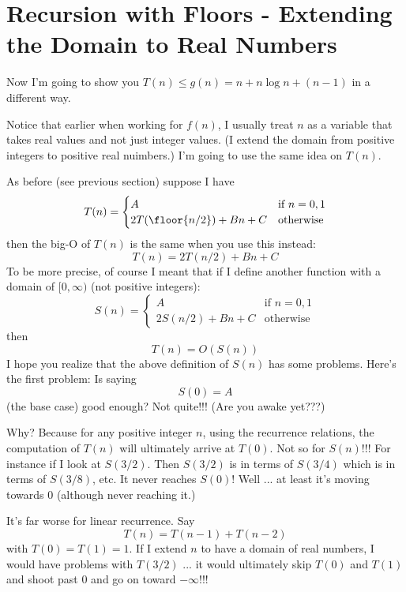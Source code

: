\section{Recursion with Floors - Extending the 
Domain to Real Numbers}

Now I'm going to show you $T(n) \leq g(n) = n + n \log n + (n - 1)$
in a different way.

Notice that earlier when working for $f(n)$, I usually treat $n$
as a variable that takes real values and not just integer values.
(I extend the domain from positive integers to positive real nuimbers.)
I'm going to use the same idea on $T(n)$.

As before (see previous section) suppose I have
\[
T(n) 
= 
\begin{cases}
A                        & \text{if $n = 0, 1$} \\
2T(\floor{n/2}) + Bn + C & \text{otherwise}
\end{cases}
\]
then the big-O of $T(n)$ is the same when you use this instead:
\[
T(n) = 2T(n/2) + Bn + C
\]
To be more precise, of course I meant that if I define another function
with a domain of $[0, \infty)$ (not positive integers):
\[
S(n) 
= 
\begin{cases}
A                & \text{if $n = 0, 1$} \\
2S(n/2) + Bn + C & \text{otherwise}
\end{cases}
\]
then
\[
T(n) = O(S(n))
\]
I hope you realize that the above definition of $S(n)$ has some problems.
Here's the first problem:
Is saying
\[
S(0) = A
\]
(the base case) good enough?
Not quite!!! 
(Are you awake yet???)

Why?
Because for any positive integer $n$, using the recurrence relations,
the computation of $T(n)$ will ultimately arrive at $T(0)$.
Not so for $S(n)$!!!
For instance if I look at $S(3/2)$. 
Then $S(3/2)$ is in terms of $S(3/4)$ which is in terms of 
$S(3/8)$, etc.
It never reaches $S(0)$!
Well ... at least it's moving towards 0 (although never reaching it.)

It's far worse for linear recurrence.
Say
\[
T(n) = T(n - 1) + T(n - 2)
\]
with $T(0) = T(1) = 1$.
If I extend $n$ to have a domain of real numbers, I would have
problems with $T(3/2)$ ... it would ultimately skip $T(0)$ and $T(1)$ and shoot
past $0$ and go on toward $-\infty$!!!

